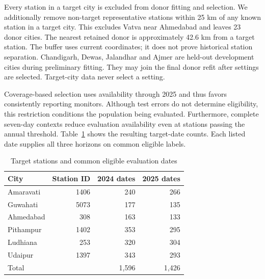 \documentclass[conference]{IEEEtran}
\begin{document}
Every station in a target city is excluded from donor fitting and selection. We additionally remove non-target representative stations within 25 km of any known station in a target city. This excludes Vatva near Ahmedabad and leaves 23 donor cities. The nearest retained donor is approximately 42.6 km from a target station. The buffer uses current coordinates; it does not prove historical station separation. Chandigarh, Dewas, Jalandhar and Ajmer are held-out development cities during preliminary fitting. They may join the final donor refit after settings are selected. Target-city data never select a setting.

Coverage-based selection uses availability through 2025 and thus favors consistently reporting monitors. Although test errors do not determine eligibility, this restriction conditions the population being evaluated. Furthermore, complete seven-day contexts reduce evaluation availability even at stations passing the annual threshold. Table~\ref{tab:cohort} shows the resulting target-date counts. Each listed date supplies all three horizons on common eligible labels.

\begin{table}[t]
\caption{Target stations and common eligible evaluation dates}
\label{tab:cohort}
\centering\small
\begin{tabular}{lrrr}\toprule
City & Station ID & 2024 dates & 2025 dates\\\midrule
Amaravati & 1406 & 240 & 266\\
Guwahati & 5073 & 177 & 135\\
Ahmedabad & 308 & 163 & 133\\
Pithampur & 1402 & 353 & 295\\
Ludhiana & 253 & 320 & 304\\
Udaipur & 1397 & 343 & 293\\\midrule
Total & & 1,596 & 1,426\\\bottomrule
\end{tabular}
\end{table}
\end{document}
